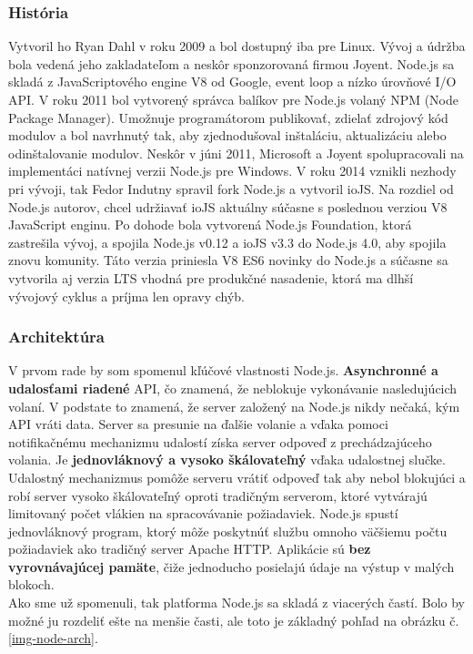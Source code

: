 \subsubsection{História}
Vytvoril ho Ryan Dahl v roku 2009 a bol dostupný iba pre Linux. Vývoj a údržba bola vedená jeho zakladateľom a neskôr sponzorovaná firmou Joyent. Node.js sa skladá z JavaScriptového engine V8 od Google, event loop a nízko úrovňové I/O API. V roku 2011 bol vytvorený správca balíkov pre Node.js volaný NPM (Node Package Manager). Umožnuje programátorom publikovať, zdielať zdrojový kód modulov a bol navrhnutý tak, aby zjednodušoval inštaláciu, aktualizáciu alebo odinštalovanie modulov. Neskôr v júni 2011, Microsoft a Joyent spolupracovali na implementáci natívnej verzii Node.js pre Windows. V roku 2014 vznikli nezhody pri vývoji, tak Fedor Indutny spravil fork Node.js a vytvoril ioJS. Na rozdiel od Node.js autorov, chcel udržiavať ioJS aktuálny súčasne s poslednou verziou V8 JavaScript enginu. Po dohode bola vytvorená Node.js Foundation, ktorá zastrešila vývoj, a spojila Node.js v0.12 a ioJS v3.3 do Node.js 4.0, aby spojila znovu komunity. Táto verzia priniesla V8 ES6 novinky do Node.js a súčasne sa vytvorila aj verzia LTS vhodná pre produkčné nasadenie, ktorá ma dlhší vývojový cyklus a príjma len opravy chýb.\cite{nodejs-wiki}

\subsubsection{Architektúra}
V prvom rade by som spomenul kľúčové vlastnosti Node.js. \textbf{Asynchronné a udalosťami riadené} API, čo znamená, že neblokuje vykonávanie nasledujúcich volaní. V podstate to znamená, že server založený na Node.js nikdy nečaká, kým API vráti data. Server sa presunie na ďalšie volanie a vďaka pomoci notifikačnému mechanizmu udalostí získa server odpoveď z prechádzajúceho volania.
Je \textbf{jednovláknový a vysoko škálovateľný} vďaka udalostnej slučke. Udalostný mechanizmus pomôže serveru vrátiť odpoveď tak aby nebol blokujúci a robí server vysoko škálovateľný oproti tradičným serverom, ktoré vytvárajú limitovaný počet vlákien na spracovávanie požiadaviek. Node.js spustí jednovláknový program, ktorý môže poskytnúť službu omnoho väčšiemu počtu požiadaviek ako tradičný server Apache HTTP. Aplikácie sú \textbf{bez vyrovnávajúcej pamäte}, čiže jednoducho posielajú údaje na výstup v malých blokoch.\\

Ako sme už spomenuli, tak platforma Node.js sa skladá z viacerých častí. Bolo by možné ju rozdeliť ešte na menšie časti, ale toto je základný pohľad na obrázku č.\ref{img-node-arch}.

